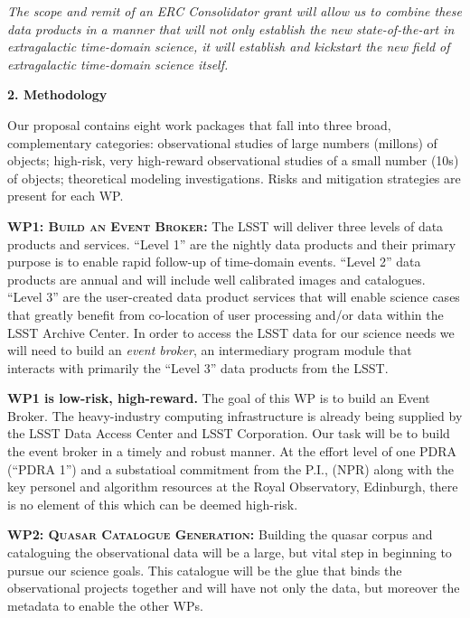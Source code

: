\documentclass[oneside, a4paper, onecolumn, 11pt]{article}
\begin{document}
\smallskip
\smallskip
\noindent
{\it The scope and
remit of an ERC Consolidator grant will allow us to combine these data
products in a manner that will not only establish the new
state-of-the-art in extragalactic time-domain science, it will
establish and kickstart the new field of extragalactic time-domain 
science itself.}





\medskip
\medskip
\noindent
\large
{\bf{\textcolor{Cerulean}{2. Methodology}}}
\normalsize

\noindent
Our proposal contains eight work packages that fall into three broad,
complementary categories: observational studies of large numbers
(millons) of objects; high-risk, very high-reward observational
studies of a small number (10s) of objects; theoretical modeling
investigations. Risks and mitigation strategies are present for each
WP.


\smallskip
\smallskip
\noindent
\textbf{\textsc{WP1: Build an Event Broker:}} 
The LSST will deliver three levels of data products and
services. ``Level 1'' are the nightly data products and their primary
purpose is to enable rapid follow-up of time-domain events. ``Level
2'' data products are annual and will include well calibrated images
and catalogues. ``Level 3'' are the user-created data product services
that will enable science cases that greatly benefit from co-location
of user processing and/or data within the LSST Archive Center. In
order to access the LSST data for our science needs we will need to
build an {\it event broker}, an intermediary program module that
interacts with primarily the ``Level 3'' data products from the LSST.

\noindent
{\bf WP1 is low-risk, high-reward.} 
The goal of this WP is to build an Event Broker.  The heavy-industry
computing infrastructure is already being supplied by the LSST Data
Access Center and LSST Corporation. Our task will be to build the
event broker in a timely and robust manner. At the effort level of one
PDRA (``PDRA 1'') and a substatioal commitment from the P.I., (NPR)
along with the key personel and algorithm resources at the Royal
Observatory, Edinburgh, there is no element of this which can be
deemed high-risk.


\smallskip
\smallskip
\noindent
\textbf{\textsc{WP2: Quasar Catalogue Generation:}} 
Building the quasar corpus and cataloguing the observational data will
be a large, but vital step in beginning to pursue our science
goals. This catalogue will be the glue that binds the observational
projects together and will have not only the data, but moreover the
metadata to enable the other WPs.
\end{document}
